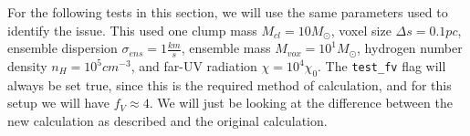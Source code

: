 \documentclass[a4paper]{article}
\begin{document}
    For the following tests in this section, we will use the same parameters used to identify the issue.
    This used one clump mass \(M_{cl} = 10 M_\odot\),
    voxel size \(\Delta s = 0.1 pc\),
    ensemble dispersion \(\sigma_{ens} = 1 \frac{km}{s}\),
    ensemble mass \(M_{vox} = 10^{1} M_\odot\),
    hydrogen number density \(n_H = 10^{5} cm^{-3}\),
    and far-UV radiation \(\chi = 10^{4} \chi_0\).
    The \texttt{test\_fv} flag will always be set true, since this is the required method of calculation, and for this setup we will have \(f_V \approx 4\).
    We will just be looking at the difference between the new calculation as described and the original calculation.
\end{document}
